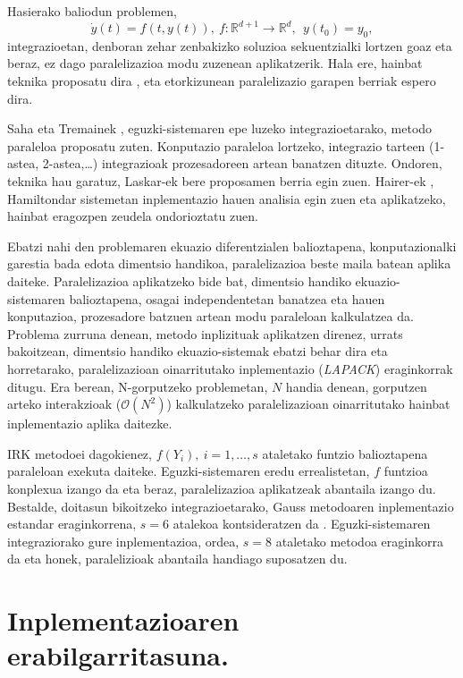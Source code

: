 Hasierako baliodun problemen,
\begin{equation}
 \label{eq:eztivp}
\dot{y}(t)=f(t,y(t)), \ f: \mathbb{R}^{d+1} \longrightarrow \mathbb{R}^d, \ \ y(t_0)=y_0,
\end{equation} 
integrazioetan, denboran zehar zenbakizko soluzioa sekuentzialki lortzen goaz eta beraz, ez dago  paralelizazioa modu zuzenean aplikatzerik. Hala ere, hainbat teknika proposatu dira \cite{Burrage1993}, eta etorkizunean paralelizazio garapen berriak espero dira.   

Saha eta Tremainek \cite{Saha1996}, eguzki-sistemaren epe luzeko integrazioetarako, metodo paraleloa proposatu zuten. Konputazio paraleloa lortzeko, integrazio tarteen (1-astea, 2-astea,\dots) integrazioak prozesadoreen artean banatzen dituzte. Ondoren, teknika hau garatuz, Laskar-ek \cite{Jimenez-Perez2011} bere proposamen berria egin zuen. Hairer-ek \cite{Gander2014}, Hamiltondar sistemetan inplementazio hauen  analisia egin zuen eta aplikatzeko, hainbat eragozpen zeudela ondorioztatu zuen.

Ebatzi nahi den problemaren ekuazio diferentzialen balioztapena, konputazionalki garestia bada edota dimentsio handikoa, paralelizazioa beste maila batean aplika daiteke. Paralelizazioa aplikatzeko bide bat, dimentsio handiko ekuazio-sistemaren balioztapena, osagai independentetan banatzea eta hauen konputazioa, prozesadore batzuen artean modu paraleloan kalkulatzea da. Problema zurruna denean, metodo inplizituak aplikatzen direnez, urrats bakoitzean, dimentsio handiko ekuazio-sistemak ebatzi behar dira eta horretarako, paralelizazioan oinarritutako inplementazio (\emph{LAPACK}) eraginkorrak ditugu. Era berean, N-gorputzeko problemetan, $N$ handia denean, gorputzen arteko interakzioak ($\mathcal{O}(N^2)$) kalkulatzeko         
paralelizazioan oinarritutako hainbat inplementazio \cite{Barnes1986,Carrier1988,Driscoll2013} aplika daitezke. 

IRK metodoei dagokienez, $f(Y_i), \ i=1,\dots,s$ ataletako funtzio balioztapena paraleloan exekuta daiteke. Eguzki-sistemaren eredu errealistetan, $f$ funtzioa konplexua izango da eta beraz, paralelizazioa aplikatzeak abantaila izango du. Bestalde, doitasun bikoitzeko integrazioetarako, Gauss metodoaren inplementazio estandar eraginkorrena, $s=6$ atalekoa kontsideratzen da \cite{Hairer2006}. Eguzki-sistemaren integraziorako gure inplementazioa, ordea, $s=8$ ataletako metodoa eraginkorra da eta honek, paralelizioak abantaila handiago suposatzen du.    


\section{Inplementazioaren erabilgarritasuna.}


